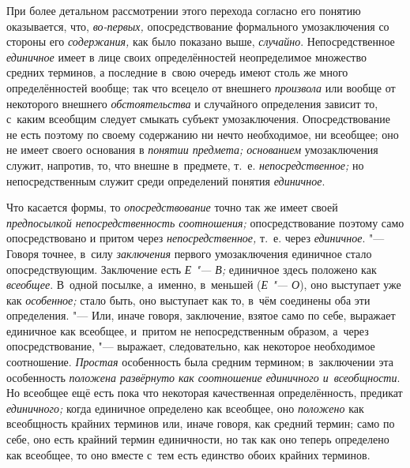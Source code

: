 При более детальном рассмотрении этого перехода согласно его
понятию оказывается, что, {\em во-первых,}
опосредствование формального умозаключения со стороны его
{\em содержания,} как было показано выше, {\em случайно}.
Непосредственное {\em единичное} имеет в
лице своих определённостей неопределимое множество средних терминов, а
последние в~свою очередь имеют столь же много определённостей вообще; так
что всецело от внешнего {\em произвола}
или вообще от некоторого внешнего {\em обстоятельства} и
случайного определения зависит то, с~каким всеобщим следует смыкать субъект
умозаключения. Опосредствование не есть поэтому по своему содержанию ни
нечто необходимое, ни всеобщее; оно не имеет своего основания в
{\em понятии предмета; основанием}
умозаключения служит, напротив, то, что внешне в~предмете,
т.~е. {\em непосредственное;}
но непосредственным служит среди определений понятия {\em единичное}.

Что касается формы, то {\em опосредствование} точно так же имеет своей
{\em предпосылкой непосредственность
соотношения;} опосредствование поэтому само опосредствовано
и притом через {\em непосредственное,} т.~е. через {\em единичное}. "--- Говоря
точнее, в~силу {\em заключения}
первого умозаключения единичное стало опосредствующим.
Заключение есть {\em Е "--- В;} единичное здесь положено как
{\em всеобщее}. В~одной посылке, а~именно, в~меньшей ({\em Е "--- О}),
оно выступает уже как {\em особенное;} стало
быть, оно выступает как то, в~чём соединены оба эти определения. "---
Или, иначе говоря, заключение, взятое само по себе, выражает
единичное как всеобщее, и~притом не непосредственным образом, а~через
опосредствование, "--- выражает, следовательно, как некоторое
необходимое соотношение. {\em Простая}
особенность была средним термином; в~заключении эта
особенность {\em положена развёрнуто как
соотношение единичного и~всеобщности}. Но всеобщее ещё есть
пока что некоторая качественная определённость, предикат
{\em единичного;} когда единичное определено как всеобщее, оно
{\em положено} как
всеобщность крайних терминов или, иначе говоря, как средний термин; само по
себе, оно есть крайний термин единичности, но так как оно теперь определено
как всеобщее, то оно вместе с~тем есть единство обоих крайних терминов.


